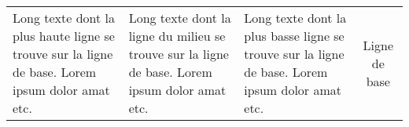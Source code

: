 \begin{tabular}{p{3cm} | m{3cm} | b{3cm} | c}
	Long texte dont la plus haute ligne se trouve sur la ligne de base. Lorem ipsum dolor amat etc. 
	& 
	Long texte dont la ligne du milieu se trouve sur la ligne de base. Lorem ipsum dolor amat etc. 
	&
	 Long texte dont la plus basse ligne se trouve sur la ligne de base. Lorem ipsum dolor amat etc. 
	 &
	 Ligne de base
\end{tabular}

